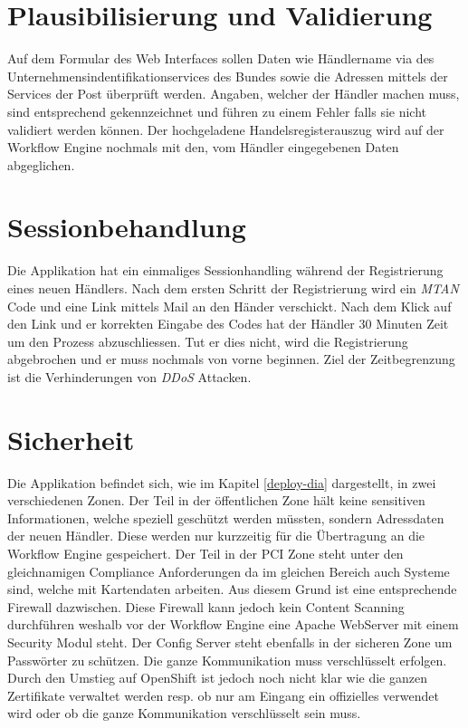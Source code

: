 \section{Plausibilisierung und Validierung}

Auf dem Formular des Web Interfaces sollen Daten wie Händlername via des Unternehmensindentifikationservices des Bundes sowie die Adressen mittels der Services der Post überprüft werden. Angaben, welcher der Händler machen muss, sind entsprechend gekennzeichnet und führen zu einem Fehler falls sie nicht validiert werden können. Der hochgeladene Handelsregisterauszug wird auf der Workflow Engine nochmals mit den, vom Händler eingegebenen Daten abgeglichen.
\newpage
\section{Sessionbehandlung}

Die Applikation hat ein einmaliges Sessionhandling während der Registrierung eines neuen Händlers. Nach dem ersten Schritt der Registrierung wird ein \textit{\gls{MTAN}} Code und eine Link mittels Mail an den Händer verschickt. Nach dem Klick auf den Link und er korrekten Eingabe des Codes hat der Händler 30 Minuten Zeit um den Prozess abzuschliessen.
Tut er dies nicht, wird die Registrierung abgebrochen und er muss nochmals von vorne beginnen. Ziel der Zeitbegrenzung ist die Verhinderungen von \textit{\gls{DDoS}} Attacken.

\section{Sicherheit}

Die Applikation befindet sich, wie im Kapitel \ref{deploy-dia} dargestellt, in zwei verschiedenen Zonen. Der Teil in der öffentlichen Zone hält keine sensitiven Informationen, welche speziell geschützt werden müssten, sondern Adressdaten der neuen Händler. Diese werden nur kurzzeitig für die Übertragung an die Workflow Engine gespeichert. Der Teil in der PCI Zone steht unter den gleichnamigen Compliance Anforderungen da im gleichen Bereich auch Systeme sind, welche mit Kartendaten arbeiten. Aus diesem Grund ist eine entsprechende Firewall dazwischen. Diese Firewall kann jedoch kein Content Scanning durchführen weshalb vor der Workflow Engine eine Apache WebServer mit einem Security Modul steht. Der Config Server steht ebenfalls in der sicheren Zone um Passwörter zu schützen. Die ganze Kommunikation muss verschlüsselt erfolgen. Durch den Umstieg auf OpenShift ist jedoch noch nicht klar wie die ganzen Zertifikate verwaltet werden resp. ob nur am Eingang ein offizielles verwendet wird oder ob die ganze Kommunikation verschlüsselt sein muss.

